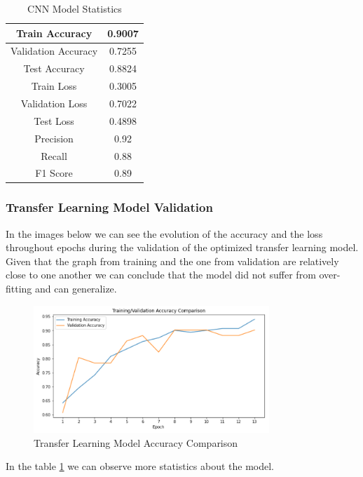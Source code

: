 \documentclass[conference]{IEEEtran}
\begin{document}
\begin{table}[htbp]
\centering
\caption{CNN Model Statistics}
\begin{center}
\begin{tabular}{|c|c|}
\hline
Train Accuracy & 0.9007 \\
\hline
Validation Accuracy & 0.7255 \\
\hline
Test Accuracy & 0.8824 \\
\hline
Train Loss & 0.3005\\
\hline
Validation Loss & 0.7022 \\
\hline
Test Loss &  0.4898\\
\hline
Precision & 0.92\\
\hline
Recall & 0.88\\
\hline
F1 Score & 0.89 \\
\hline
\end{tabular}
\end{center}
\label{table:2}
\end{table}

\subsubsection{Transfer Learning Model Validation}

In the images below we can see the evolution of the accuracy and the loss throughout epochs during the validation of the optimized transfer learning model. Given that the graph from training and the one from validation are relatively close to one another we can conclude that the model did not suffer from over-fitting and can generalize.


\begin{figure}[H]
    \centering
    \includegraphics[width=3.5in]{transferl_val_accuracy.PNG}
    \caption{Transfer Learning Model Accuracy Comparison}\label{fig:fig14}
\end{figure}

In the table \ref{table:2} we can observe more statistics about the model.
\end{document}

